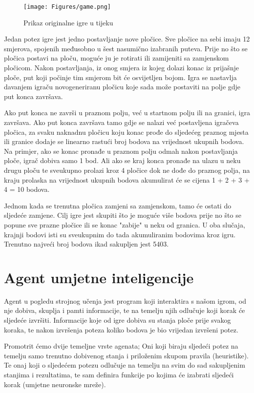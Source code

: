 \documentclass[zavrsnirad]{fer}
\begin{document}
\begin{figure}[htb]
	\centering
	\texttt{[image: Figures/game.png]} 
	\caption{Prikaz originalne igre u tijeku}
	\label{slk:game_screen}
\end{figure}

Jedan potez igre jest jedno postavljanje nove pločice. Sve pločice na sebi imaju 12 smjerova, spojenih međusobno u šest nasumično izabranih puteva. Prije no što se pločica postavi na ploču, moguće ju je rotirati ili zamijeniti sa zamjenskom pločicom. Nakon postavljanja, iz onog smjera iz kojeg dolazi konac iz prijašnje ploče, put koji počinje tim smjerom bit će osvijetljen bojom. Igra se nastavlja davanjem igraču novogeneriranu pločicu koje sada može postaviti na polje gdje put konca završava.

Ako put konca ne završi u praznom polju, već u startnom polju ili na granici, igra završava. Ako put konca završava tamo gdje se nalazi već postavljena igračeva pločica, za svaku naknadnu pločicu koju konac prođe do sljedećeg praznog mjesta ili granice dodaje se linearno rastući broj bodova na vrijednost ukupnih bodova. Na primjer, ako se konac pronađe u praznom polju odmah nakon postavljanja ploče, igrač dobiva samo 1 bod. Ali ako se kraj konca pronađe na ulazu u neku drugu ploču te sveukupno prolazi kroz 4 pločice dok ne dođe do praznog polja, na kraju prolaska na vrijednost ukupnih bodova akumulirat će se cijena 1 + 2 + 3 + 4 = 10 bodova.

Jednom kada se trenutna pločica zamjeni sa zamjenskom, tamo će ostati do sljedeće zamjene. Cilj igre jest skupiti što je moguće više bodova prije no što se popune sve prazne pločice ili se konac "zabije" u neku od granica. U oba slučaja, krajnji bodovi isti su sveukupnim do tada akumuliranim bodovima kroz igru. Trenutno najveći broj bodova ikad sakupljen jest 5403.

\section{Agent umjetne inteligencije}
\label{pog:agent}
Agent u pogledu strojnog učenja jest program koji interaktira s našom igrom, od nje dobiva, skuplja i pamti informacije, te na temelju njih odlučuje koji korak će sljedeće izvršiti. Informacije koje od igre dobiva su stanja ploče prije svakog koraka, te nakon izvršenja poteza koliko bodova je bio vrijedan izvršeni potez.

Promotrit ćemo dvije temeljne vrste agenata; Oni koji biraju sljedeći potez na temelju samo trenutno dobivenog stanja i priloženim skupom pravila (heuristike). Te onaj koji o sljedećem potezu odlučuje na temelju na svim do sad sakupljenim stanjima i rezultatima, te sam definira funkcije po kojima će izabrati sljedeći korak (umjetne neuronske mreže). 
\end{document}
